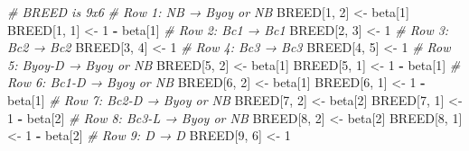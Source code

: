\documentclass[
  12pt,
]{krantz}
\newenvironment{Shaded}{\begin{snugshade}}{\end{snugshade}}
\newcommand{\CommentTok}[1]{\textcolor[rgb]{0.56,0.35,0.01}{\textit{#1}}}
\newcommand{\DecValTok}[1]{\textcolor[rgb]{0.00,0.00,0.81}{#1}}
\newcommand{\NormalTok}[1]{#1}
\newcommand{\OtherTok}[1]{\textcolor[rgb]{0.56,0.35,0.01}{#1}}
\newcommand{\SpecialCharTok}[1]{\textcolor[rgb]{0.81,0.36,0.00}{\textbf{#1}}}
\begin{document}
\begin{Shaded}
\begin{Highlighting}[]
\CommentTok{\# BREED is 9x6}
\CommentTok{\# Row 1: NB → Byoy or NB}
\NormalTok{BREED[}\DecValTok{1}\NormalTok{, }\DecValTok{2}\NormalTok{] }\OtherTok{\textless{}{-}}\NormalTok{ beta[}\DecValTok{1}\NormalTok{]}
\NormalTok{BREED[}\DecValTok{1}\NormalTok{, }\DecValTok{1}\NormalTok{] }\OtherTok{\textless{}{-}} \DecValTok{1} \SpecialCharTok{{-}}\NormalTok{ beta[}\DecValTok{1}\NormalTok{]}
\CommentTok{\# Row 2: Bc1 → Bc1}
\NormalTok{BREED[}\DecValTok{2}\NormalTok{, }\DecValTok{3}\NormalTok{] }\OtherTok{\textless{}{-}} \DecValTok{1}
\CommentTok{\# Row 3: Bc2 → Bc2}
\NormalTok{BREED[}\DecValTok{3}\NormalTok{, }\DecValTok{4}\NormalTok{] }\OtherTok{\textless{}{-}} \DecValTok{1}
\CommentTok{\# Row 4: Bc3 → Bc3}
\NormalTok{BREED[}\DecValTok{4}\NormalTok{, }\DecValTok{5}\NormalTok{] }\OtherTok{\textless{}{-}} \DecValTok{1}
\CommentTok{\# Row 5: Byoy{-}D → Byoy or NB}
\NormalTok{BREED[}\DecValTok{5}\NormalTok{, }\DecValTok{2}\NormalTok{] }\OtherTok{\textless{}{-}}\NormalTok{ beta[}\DecValTok{1}\NormalTok{]}
\NormalTok{BREED[}\DecValTok{5}\NormalTok{, }\DecValTok{1}\NormalTok{] }\OtherTok{\textless{}{-}} \DecValTok{1} \SpecialCharTok{{-}}\NormalTok{ beta[}\DecValTok{1}\NormalTok{]}
\CommentTok{\# Row 6: Bc1{-}D → Byoy or NB}
\NormalTok{BREED[}\DecValTok{6}\NormalTok{, }\DecValTok{2}\NormalTok{] }\OtherTok{\textless{}{-}}\NormalTok{ beta[}\DecValTok{1}\NormalTok{]}
\NormalTok{BREED[}\DecValTok{6}\NormalTok{, }\DecValTok{1}\NormalTok{] }\OtherTok{\textless{}{-}} \DecValTok{1} \SpecialCharTok{{-}}\NormalTok{ beta[}\DecValTok{1}\NormalTok{]}
\CommentTok{\# Row 7: Bc2{-}D → Byoy or NB}
\NormalTok{BREED[}\DecValTok{7}\NormalTok{, }\DecValTok{2}\NormalTok{] }\OtherTok{\textless{}{-}}\NormalTok{ beta[}\DecValTok{2}\NormalTok{]}
\NormalTok{BREED[}\DecValTok{7}\NormalTok{, }\DecValTok{1}\NormalTok{] }\OtherTok{\textless{}{-}} \DecValTok{1} \SpecialCharTok{{-}}\NormalTok{ beta[}\DecValTok{2}\NormalTok{]}
\CommentTok{\# Row 8: Bc3{-}L → Byoy or NB}
\NormalTok{BREED[}\DecValTok{8}\NormalTok{, }\DecValTok{2}\NormalTok{] }\OtherTok{\textless{}{-}}\NormalTok{ beta[}\DecValTok{2}\NormalTok{]}
\NormalTok{BREED[}\DecValTok{8}\NormalTok{, }\DecValTok{1}\NormalTok{] }\OtherTok{\textless{}{-}} \DecValTok{1} \SpecialCharTok{{-}}\NormalTok{ beta[}\DecValTok{2}\NormalTok{]}
\CommentTok{\# Row 9: D → D}
\NormalTok{BREED[}\DecValTok{9}\NormalTok{, }\DecValTok{6}\NormalTok{] }\OtherTok{\textless{}{-}} \DecValTok{1}


\end{Highlighting}
\end{Shaded}
\end{document}
